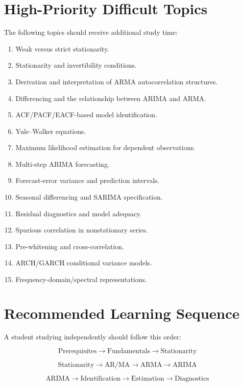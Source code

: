 \documentclass[11pt]{article}
\begin{document}
\section{High-Priority Difficult Topics}

The following topics should receive additional study time:

\begin{enumerate}
    \item Weak versus strict stationarity.
    \item Stationarity and invertibility conditions.
    \item Derivation and interpretation of ARMA autocorrelation structures.
    \item Differencing and the relationship between ARIMA and ARMA.
    \item ACF/PACF/EACF-based model identification.
    \item Yule--Walker equations.
    \item Maximum likelihood estimation for dependent observations.
    \item Multi-step ARIMA forecasting.
    \item Forecast-error variance and prediction intervals.
    \item Seasonal differencing and SARIMA specification.
    \item Residual diagnostics and model adequacy.
    \item Spurious correlation in nonstationary series.
    \item Pre-whitening and cross-correlation.
    \item ARCH/GARCH conditional variance models.
    \item Frequency-domain/spectral representations.
\end{enumerate}

\section{Recommended Learning Sequence}

A student studying independently should follow this order:

\[
\boxed{
\text{Prerequisites}
\rightarrow
\text{Fundamentals}
\rightarrow
\text{Stationarity}
}
\]

\[
\boxed{
\text{Stationarity}
\rightarrow
\text{AR/MA}
\rightarrow
\text{ARMA}
\rightarrow
\text{ARIMA}
}
\]

\[
\boxed{
\text{ARIMA}
\rightarrow
\text{Identification}
\rightarrow
\text{Estimation}
\rightarrow
\text{Diagnostics}
}
\]
\end{document}
